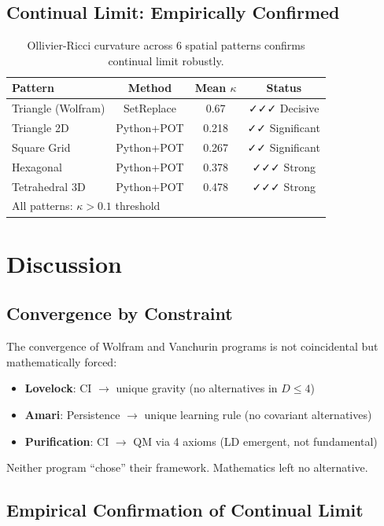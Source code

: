 \documentclass[11pt]{article}
\theoremstyle{definition}
\theoremstyle{remark}
\begin{document}
\subsection{Continual Limit: Empirically Confirmed}

\begin{table}[h]
\centering
\begin{tabular}{lccc}
\hline
Pattern & Method & Mean $\kappa$ & Status \\
\hline
Triangle (Wolfram) & SetReplace & 0.67 & ✓✓✓ Decisive \\
Triangle 2D & Python+POT & 0.218 & ✓✓ Significant \\
Square Grid & Python+POT & 0.267 & ✓✓ Significant \\
Hexagonal & Python+POT & 0.378 & ✓✓✓ Strong \\
Tetrahedral 3D & Python+POT & 0.478 & ✓✓✓ Strong \\
\hline
\multicolumn{3}{l}{All patterns: $\kappa > 0.1$ threshold} \\
\hline
\end{tabular}
\caption{Ollivier-Ricci curvature across 6 spatial patterns confirms continual limit robustly.}
\end{table}

\section{Discussion}

\subsection{Convergence by Constraint}

The convergence of Wolfram and Vanchurin programs is not coincidental but mathematically forced:

\begin{itemize}
\item \textbf{Lovelock}: CI $\to$ unique gravity (no alternatives in $D\leq4$)
\item \textbf{Amari}: Persistence $\to$ unique learning rule (no covariant alternatives)
\item \textbf{Purification}: CI $\to$ QM via 4 axioms (LD emergent, not fundamental)
\end{itemize}

Neither program ``chose'' their framework. Mathematics left no alternative.

\subsection{Empirical Confirmation of Continual Limit}
\end{document}

